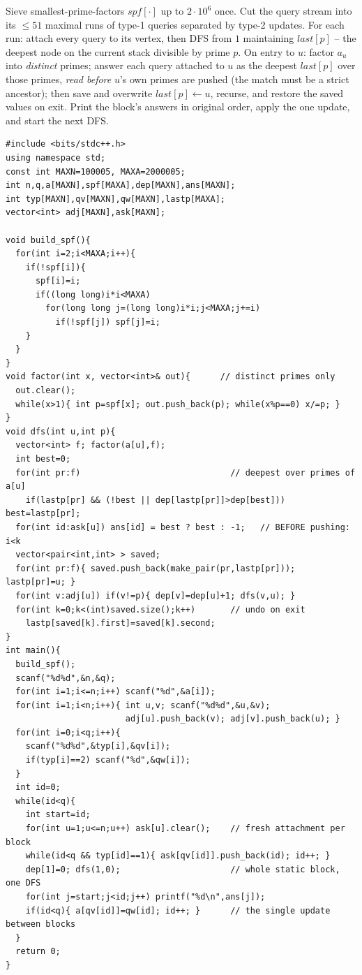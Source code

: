 Sieve smallest-prime-factors \(\mathit{spf}[\cdot]\) up to \(2\cdot10^6\) once.
Cut the query stream into its \(\le 51\) maximal runs of type-1 queries
separated by type-2 updates.  For each run: attach every query to its vertex,
then DFS from \(1\) maintaining \(\mathit{last}[p]\) -- the deepest node on the
current stack divisible by prime \(p\).  On entry to \(u\): factor \(a_u\) into
\emph{distinct} primes; answer each query attached to \(u\) as the deepest
\(\mathit{last}[p]\) over those primes, \emph{read before} \(u\)'s own primes
are pushed (the match must be a strict ancestor); then save and overwrite
\(\mathit{last}[p]\leftarrow u\), recurse, and restore the saved values on
exit.  Print the block's answers in original order, apply the one update, and
start the next DFS.

\begin{lstlisting}[caption={CF 463E: one DFS per static block. The recursion stack carries the root path; lastp[p] is the deepest stack node divisible by prime p, saved and undone around each node; queries are read before the push. ASCII only}, label={lst:c21-caisa}]
#include <bits/stdc++.h>
using namespace std;
const int MAXN=100005, MAXA=2000005;
int n,q,a[MAXN],spf[MAXA],dep[MAXN],ans[MAXN];
int typ[MAXN],qv[MAXN],qw[MAXN],lastp[MAXA];
vector<int> adj[MAXN],ask[MAXN];

void build_spf(){
  for(int i=2;i<MAXA;i++){
    if(!spf[i]){
      spf[i]=i;
      if((long long)i*i<MAXA)
        for(long long j=(long long)i*i;j<MAXA;j+=i)
          if(!spf[j]) spf[j]=i;
    }
  }
}
void factor(int x, vector<int>& out){      // distinct primes only
  out.clear();
  while(x>1){ int p=spf[x]; out.push_back(p); while(x%p==0) x/=p; }
}
void dfs(int u,int p){
  vector<int> f; factor(a[u],f);
  int best=0;
  for(int pr:f)                              // deepest over primes of a[u]
    if(lastp[pr] && (!best || dep[lastp[pr]]>dep[best])) best=lastp[pr];
  for(int id:ask[u]) ans[id] = best ? best : -1;   // BEFORE pushing: i<k
  vector<pair<int,int> > saved;
  for(int pr:f){ saved.push_back(make_pair(pr,lastp[pr])); lastp[pr]=u; }
  for(int v:adj[u]) if(v!=p){ dep[v]=dep[u]+1; dfs(v,u); }
  for(int k=0;k<(int)saved.size();k++)       // undo on exit
    lastp[saved[k].first]=saved[k].second;
}
int main(){
  build_spf();
  scanf("%d%d",&n,&q);
  for(int i=1;i<=n;i++) scanf("%d",&a[i]);
  for(int i=1;i<n;i++){ int u,v; scanf("%d%d",&u,&v);
                        adj[u].push_back(v); adj[v].push_back(u); }
  for(int i=0;i<q;i++){
    scanf("%d%d",&typ[i],&qv[i]);
    if(typ[i]==2) scanf("%d",&qw[i]);
  }
  int id=0;
  while(id<q){
    int start=id;
    for(int u=1;u<=n;u++) ask[u].clear();    // fresh attachment per block
    while(id<q && typ[id]==1){ ask[qv[id]].push_back(id); id++; }
    dep[1]=0; dfs(1,0);                      // whole static block, one DFS
    for(int j=start;j<id;j++) printf("%d\n",ans[j]);
    if(id<q){ a[qv[id]]=qw[id]; id++; }      // the single update between blocks
  }
  return 0;
}
\end{lstlisting}

